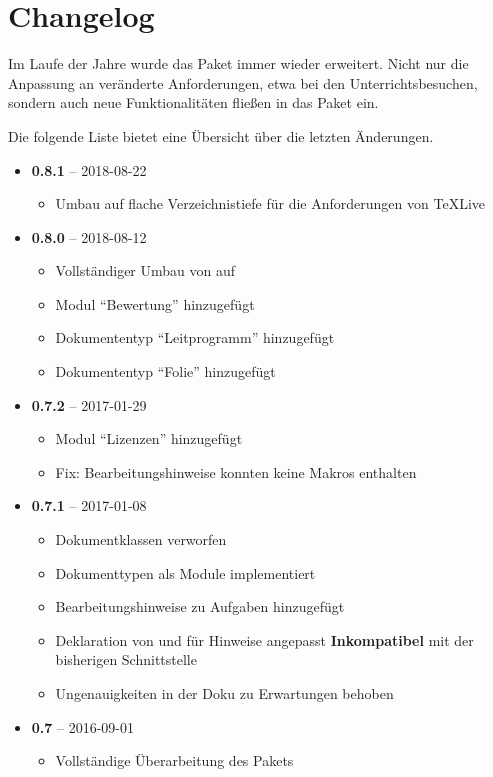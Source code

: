 \section{Changelog}
    Im Laufe der Jahre wurde das Paket immer wieder erweitert. Nicht nur die Anpassung an veränderte Anforderungen, etwa bei den Unterrichtsbesuchen, sondern auch neue Funktionalitäten fließen in das Paket ein.

    Die folgende Liste bietet eine Übersicht über die letzten Änderungen.

    \begin{itemize}
        \item \textbf{0.8.1} -- 2018-08-22
            \begin{itemize}
                \item Umbau auf flache Verzeichnistiefe für die Anforderungen von TeXLive
            \end{itemize}
        \item \textbf{0.8.0} -- 2018-08-12
            \begin{itemize}
                \item Vollständiger Umbau von  auf 
                \item Modul \enquote{Bewertung} hinzugefügt
                \item Dokumententyp \enquote{Leitprogramm} hinzugefügt
                \item Dokumententyp \enquote{Folie} hinzugefügt
            \end{itemize}
        \item \textbf{0.7.2} -- 2017-01-29
            \begin{itemize}
                \item Modul \enquote{Lizenzen} hinzugefügt
                \item Fix: Bearbeitungshinweise konnten keine Makros enthalten
            \end{itemize}
        \item \textbf{0.7.1} -- 2017-01-08
            \begin{itemize}
                \item Dokumentklassen verworfen
                \item Dokumenttypen als Module implementiert
                \item Bearbeitungshinweise zu Aufgaben hinzugefügt
                \item Deklaration von  und  für Hinweise angepasst \textbf{Inkompatibel} mit der bisherigen Schnittstelle
                \item Ungenauigkeiten in der Doku zu Erwartungen behoben
            \end{itemize}
        \item \textbf{0.7} -- 2016-09-01
            \begin{itemize}
                \item Vollständige Überarbeitung des Pakets
            \end{itemize}
    \end{itemize}
